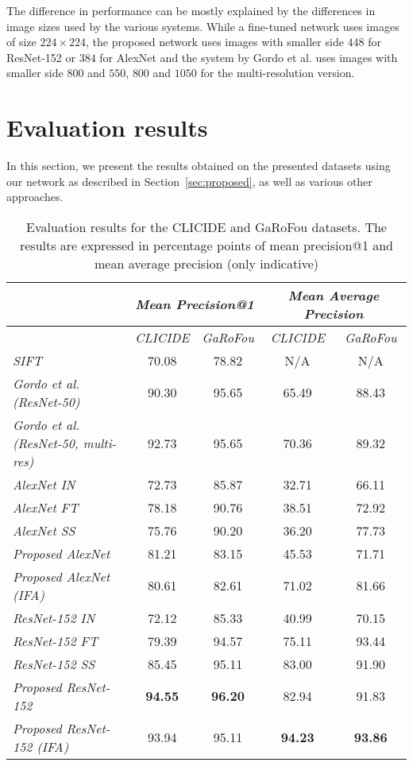 The difference in performance can be mostly explained by the
differences in image
sizes used by the various systems. While a fine-tuned network uses
images of size $224 \times 224$, the proposed network uses images
with smaller side $448$ for ResNet-152 or $384$ for AlexNet and the
system by Gordo et al. uses images with smaller side $800$ and $550$,
$800$ and $1050$ for the multi-resolution version.

\section{Evaluation results}\label{sec:evalresults}
In this section, we present the results obtained on the presented datasets
using our network as described in Section~\ref{sec:proposed}, as well
as various other approaches.

\begin{table}
\centering
\begin{tabular}{|l|c|c||c|c|}
\hline & \multicolumn{2}{c||}{\emph{Mean Precision@1}} &
\multicolumn{2}{c|}{\emph{Mean Average Precision}}\\
\hline & \emph{CLICIDE} & \emph{GaRoFou} & \emph{CLICIDE} & \emph{GaRoFou}\\
\hline \emph{SIFT} & 70.08 & 78.82 & N/A & N/A\\
\hline \emph{Gordo et al.~\cite{gordo_deep_2016} (ResNet-50)}
& 90.30 & 95.65 & 65.49 & 88.43\\
\hline \emph{Gordo et al.~\cite{gordo_deep_2016} (ResNet-50, multi-res)}
& 92.73 & 95.65 & 70.36 & 89.32\\
\hline \emph{AlexNet IN} & 72.73 & 85.87 & 32.71 & 66.11\\
\hline \emph{AlexNet FT} & 78.18 & 90.76 & 38.51 & 72.92\\
\hline \emph{AlexNet SS} & 75.76 & 90.20 & 36.20 & 77.73\\
\hline \emph{Proposed AlexNet} & 81.21 & 83.15 & 45.53 & 71.71\\
\hline \emph{Proposed AlexNet (IFA)} & 80.61 & 82.61 & 71.02 & 81.66\\
\hline \emph{ResNet-152 IN} & 72.12 & 85.33 & 40.99 & 70.15\\
\hline \emph{ResNet-152 FT} & 79.39 & 94.57 & 75.11 & 93.44\\
\hline \emph{ResNet-152 SS} & 85.45 & 95.11 & 83.00 & 91.90\\
\hline \emph{Proposed ResNet-152} & \textbf{94.55} & \textbf{96.20}
& 82.94 & 91.83\\
\hline \emph{Proposed ResNet-152 (IFA)} & 93.94 & 95.11
& \textbf{94.23} & \textbf{93.86}\\
\hline
\end{tabular}
\caption{Evaluation results for the CLICIDE and GaRoFou datasets.
The results are expressed in percentage points of
mean precision@1 and mean average precision (only indicative)
\label{tab:results}}
\end{table}

